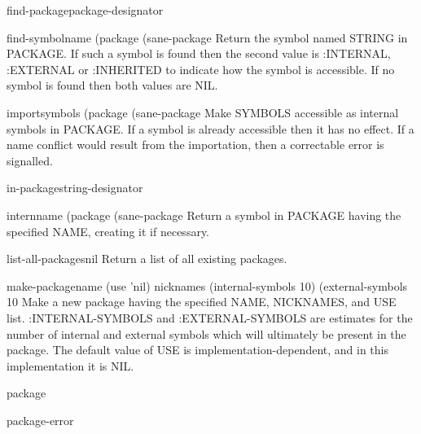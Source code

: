 \begin{function}{find-package}{package-designator}{}
  
\end{function}

\begin{function}{find-symbol}{name \op (package (sane-package}{}
  Return the symbol named STRING in PACKAGE. If such a symbol is found
  then the second value is :INTERNAL, :EXTERNAL or :INHERITED to indicate
  how the symbol is accessible. If no symbol is found then both values
  are NIL.
\end{function}

\begin{function}{import}{symbols \op (package (sane-package}{}
  Make SYMBOLS accessible as internal symbols in PACKAGE. If a symbol is
already accessible then it has no effect. If a name conflict would result from
the importation, then a correctable error is signalled.
\end{function}

\begin{macro}{in-package}{string-designator}{}
  
\end{macro}

\begin{function}{intern}{name \op (package (sane-package}{}
  Return a symbol in PACKAGE having the specified NAME, creating it
  if necessary.
\end{function}

\begin{function}{list-all-packages}{nil}{}
  Return a list of all existing packages.
\end{function}

\begin{function}{make-package}{name \key (use 'nil) nicknames (internal-symbols 10) (external-symbols 10}{}
  Make a new package having the specified NAME, NICKNAMES, and USE
list. :INTERNAL-SYMBOLS and :EXTERNAL-SYMBOLS are estimates for the number of
internal and external symbols which will ultimately be present in the package.
The default value of USE is implementation-dependent, and in this
implementation it is NIL.
\end{function}

\begin{class}{package}{}{}
  
\end{class}

\begin{condition-type}{package-error}{}{}
  
\end{condition-type}

